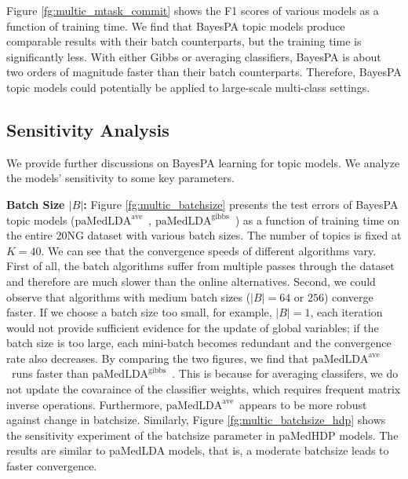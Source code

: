 \documentclass[twoside,11pt]{article}
\newcommand\paMedLDAave{$\text{paMedLDA}^{\text{ave}}$~}
\newcommand\paMedLDAgibbs{$\text{paMedLDA}^{\text{gibbs}}$~}
\newcommand{\junx}[1]{{\color{red}{\bf\sf #1}}}
\begin{document}
Figure \ref{fg:multic_mtask_commit} shows the F1 scores of various models as a function of training time. We find that BayesPA topic models produce comparable results with their batch counterparts, but the training time is significantly less. With either Gibbs or averaging classifiers, BayesPA is about two orders of magnitude faster than their batch counterparts. Therefore, BayesPA topic models could potentially be applied to large-scale multi-class settings.






\subsection{Sensitivity Analysis}\label{sec:sensitivity}

We provide further discussions on BayesPA learning for topic models. We analyze the models' sensitivity to some  key parameters.






\textbf{Batch Size $|B|$: } Figure \ref{fg:multic_batchsize} presents the test errors of BayesPA topic models (\paMedLDAave, \paMedLDAgibbs) as a function of training time on the entire 20NG dataset with various batch sizes. The number of topics is fixed at $K = 40$. We can see that the convergence speeds of different algorithms vary. First of all, the batch algorithms suffer from multiple passes through the dataset and therefore are much slower than the online alternatives. Second, we could observe that algorithms with medium batch sizes ($|B| = 64$ or $256$) converge faster. If we choose a batch size too small, for example, $|B| = 1$, each iteration would not provide sufficient evidence for the update of global variables; if the batch size is too large, each mini-batch becomes redundant and the convergence rate also decreases. By comparing the two figures, we find that \paMedLDAave runs faster than \paMedLDAgibbs. This is because for averaging classifers, we do not update the covaraince of the classifier weights, which requires frequent matrix inverse operations. Furthermore, \paMedLDAave appears to be more robust against change in batchsize. Similarly, Figure \ref{fg:multic_batchsize_hdp} shows the sensitivity experiment of the batchsize parameter in paMedHDP models. The results are similar to paMedLDA models, that is, a moderate batchsize leads to faster convergence.
\end{document}
